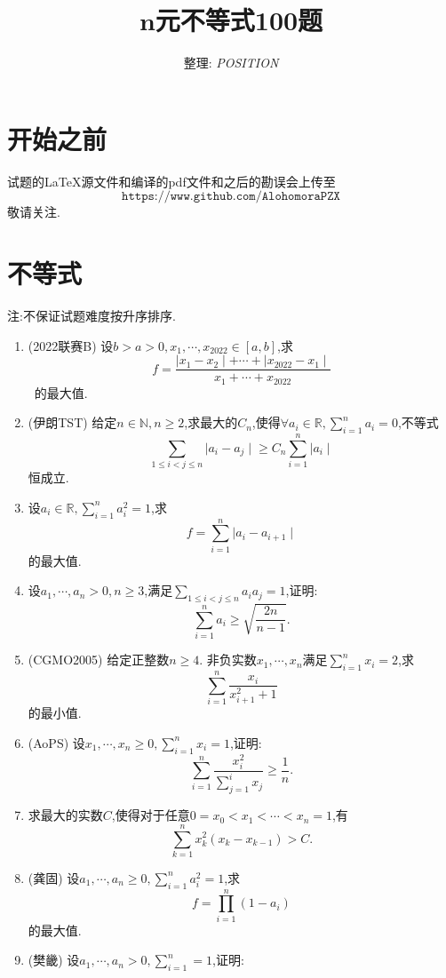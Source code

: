 \documentclass{article}
\title {\zihao{2} \textbf{$\boldsymbol{n}$元不等式100题}}
\author{整理: \emph{POSITION}}
\date{ }
\begin{document}
    \maketitle
\section{开始之前}
    试题的{\LaTeX}源文件和编译的pdf文件和之后的勘误会上传至
    $$\texttt{https://www.github.com/AlohomoraPZX}$$敬请关注.

\section{不等式}
   {\fangsong *注:不保证试题难度按升序排序.}
    \begin{enumerate} %
        \item (2022联赛B) 设$b>a>0,x_1,\cdots,x_{2022} \in [a,b]$,求\ 
            $$f=\frac{\mid x_1-x_2 \mid + \cdots + \mid x_{2022} - x_1 \mid}{x_1+\cdots+x_{2022}}$$\
            的最大值.
        \item (伊朗TST) 给定$n\in\mathbb{N},n\ge2$,求最大的$C_n$,使得$\forall a_i\in\mathbb{R},\sum_{i=1}^n{a_i}=0$,不等式 
            $$\sum_{1\le i<j\le n}{\mid a_i - a_j \mid}\ge C_n\sum_{i=1}^n{\mid a_i \mid}$$恒成立.
        \item 设$a_i\in\mathbb{R},\sum_{i=1}^n{a_i^2}=1$,求$$f=\sum_{i=1}^n{\mid a_i - a_{i+1} \mid}$$的最大值.
        \item 设$a_1,\cdots,a_n>0,n\ge3$,满足$\sum_{1\le i<j \le n}{a_i a_j}=1$,证明:\ 
            $$\sum_{i=1}^{n}{a_i}\ge\sqrt{\frac{2n}{n-1}}.$$
        \item (CGMO2005) 给定正整数$n\ge4$. 非负实数$x_1,\cdots,x_n$满足$\sum_{i=1}^n{x_i}=2$,求\
            $$\sum_{i=1}^n{\frac{x_i}{x_{i+1}^2+1}}$$的最小值.
        \item (AoPS) 设$x_1,\cdots,x_n\ge0,\sum_{i=1}^n{x_i}=1$,证明:\ 
            $$\sum_{i=1}^{n}{\frac{x_i^2}{\sum_{j=1}^i{x_j}}}\ge\frac{1}{n}.$$
        \item 求最大的实数$C$,使得对于任意$0=x_0<x_1<\cdots<x_n=1$,有\ 
            $$\sum_{k=1}^n{x_k^2\left( x_k - x_{k-1}\right)} > C.$$
        \item (龚固) 设$a_1,\cdots,a_n\ge0,\sum_{i=1}^n{a_i^2}=1$,求\ 
            $$f=\prod_{i=1}^n{\left( 1-a_i \right)}$$的最大值.
        \item (樊畿) 设$a_1,\cdots,a_n>0,\sum_{i=1}^n=1$,证明:\ 

\end{enumerate}
\end{document}

